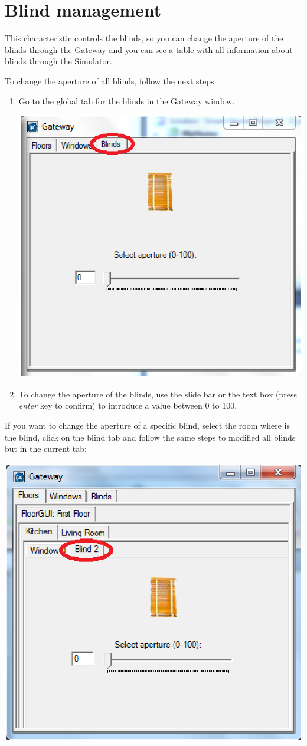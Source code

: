 \section{Blind management}
This characteristic controls the blinds, so you can change the aperture of the blinds through the Gateway and you can see a table with all information about blinds through the Simulator.

To change the aperture of all blinds, follow the next steps:
\begin{enumerate}
\item Go to the global tab for the blinds in the Gateway window.
\begin{center}
	\includegraphics[width=.68\linewidth]{images/globalBlind.eps}
	\\
\vspace{1cm}
\end{center}
\item To change the aperture of the blinds, use the slide bar or the text box (press \emph{enter} key to confirm) to introduce a value between 0 to 100.
\end{enumerate}
If you want to change the aperture of a specific blind, select the room where is the blind, click on the blind tab and follow the same steps to modified all blinds but in the current tab:
\begin{center}
	\includegraphics[width=.68\linewidth]{images/specificBlind.eps}
	\\
\vspace{1cm}
\end{center}

